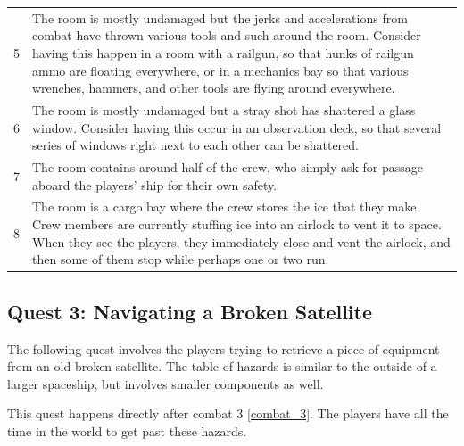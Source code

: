 \documentclass[a4paper]{article}
\begin{document}
\begin{tabular}[t]{| c | p{12.5cm} |}
5 & The room is mostly undamaged but the jerks and accelerations from combat have thrown various tools and such around the room. Consider having this happen in a room with a railgun, so that hunks of railgun ammo are floating everywhere, or in a mechanics bay so that various wrenches, hammers, and other tools are flying around everywhere. \\
6 & The room is mostly undamaged but a stray shot has shattered a glass window. Consider having this occur in an observation deck, so that several series of windows right next to each other can be shattered. \\
7 & The room contains around half of the crew, who simply ask for passage aboard the players' ship for their own safety. \\
8 & The room is a cargo bay where the crew stores the ice that they make. Crew members are currently stuffing ice into an airlock to vent it to space. When they see the players, they immediately close and vent the airlock, and then some of them stop while perhaps one or two run. \\
\bottomrule
\end{tabular}

\subsection{Quest 3: Navigating a Broken Satellite} \label{quest_3}

The following quest involves the players trying to retrieve a piece of equipment from an old broken satellite. The table of hazards is similar to the outside of a larger spaceship, but involves smaller components as well. 

This quest happens directly after combat 3 \ref{combat_3}. The players have all the time in the world to get past these hazards.
\end{document}
